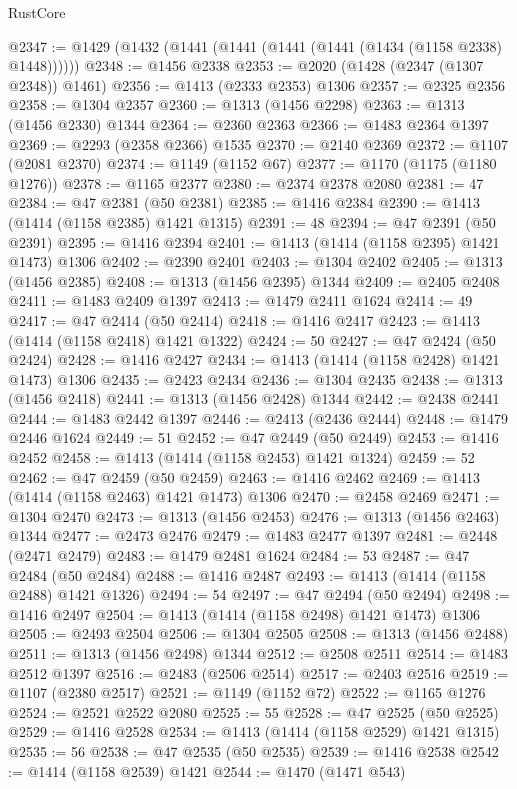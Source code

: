 \begin{lexlean}{RustCore}
\begin{coremodule}
@2347 := @1429 (@1432 (@1441 (@1441 (@1441 (@1441 (@1434 (@1158 @2338) @1448))))))
@2348 := @1456 @2338
@2353 := @2020 (@1428 (@2347 (@1307 @2348)) @1461)
@2356 := @1413 (@2333 @2353) @1306
@2357 := @2325 @2356
@2358 := @1304 @2357
@2360 := @1313 (@1456 @2298)
@2363 := @1313 (@1456 @2330) @1344
@2364 := @2360 @2363
@2366 := @1483 @2364 @1397
@2369 := @2293 (@2358 @2366) @1535
@2370 := @2140 @2369
@2372 := @1107 (@2081 @2370)
@2374 := @1149 (@1152 @67)
@2377 := @1170 (@1175 (@1180 @1276))
@2378 := @1165 @2377
@2380 := @2374 @2378 @2080
@2381 := 47
@2384 := @47 @2381 (@50 @2381)
@2385 := @1416 @2384
@2390 := @1413 (@1414 (@1158 @2385) @1421 @1315)
@2391 := 48
@2394 := @47 @2391 (@50 @2391)
@2395 := @1416 @2394
@2401 := @1413 (@1414 (@1158 @2395) @1421 @1473) @1306
@2402 := @2390 @2401
@2403 := @1304 @2402
@2405 := @1313 (@1456 @2385)
@2408 := @1313 (@1456 @2395) @1344
@2409 := @2405 @2408
@2411 := @1483 @2409 @1397
@2413 := @1479 @2411 @1624
@2414 := 49
@2417 := @47 @2414 (@50 @2414)
@2418 := @1416 @2417
@2423 := @1413 (@1414 (@1158 @2418) @1421 @1322)
@2424 := 50
@2427 := @47 @2424 (@50 @2424)
@2428 := @1416 @2427
@2434 := @1413 (@1414 (@1158 @2428) @1421 @1473) @1306
@2435 := @2423 @2434
@2436 := @1304 @2435
@2438 := @1313 (@1456 @2418)
@2441 := @1313 (@1456 @2428) @1344
@2442 := @2438 @2441
@2444 := @1483 @2442 @1397
@2446 := @2413 (@2436 @2444)
@2448 := @1479 @2446 @1624
@2449 := 51
@2452 := @47 @2449 (@50 @2449)
@2453 := @1416 @2452
@2458 := @1413 (@1414 (@1158 @2453) @1421 @1324)
@2459 := 52
@2462 := @47 @2459 (@50 @2459)
@2463 := @1416 @2462
@2469 := @1413 (@1414 (@1158 @2463) @1421 @1473) @1306
@2470 := @2458 @2469
@2471 := @1304 @2470
@2473 := @1313 (@1456 @2453)
@2476 := @1313 (@1456 @2463) @1344
@2477 := @2473 @2476
@2479 := @1483 @2477 @1397
@2481 := @2448 (@2471 @2479)
@2483 := @1479 @2481 @1624
@2484 := 53
@2487 := @47 @2484 (@50 @2484)
@2488 := @1416 @2487
@2493 := @1413 (@1414 (@1158 @2488) @1421 @1326)
@2494 := 54
@2497 := @47 @2494 (@50 @2494)
@2498 := @1416 @2497
@2504 := @1413 (@1414 (@1158 @2498) @1421 @1473) @1306
@2505 := @2493 @2504
@2506 := @1304 @2505
@2508 := @1313 (@1456 @2488)
@2511 := @1313 (@1456 @2498) @1344
@2512 := @2508 @2511
@2514 := @1483 @2512 @1397
@2516 := @2483 (@2506 @2514)
@2517 := @2403 @2516
@2519 := @1107 (@2380 @2517)
@2521 := @1149 (@1152 @72)
@2522 := @1165 @1276
@2524 := @2521 @2522 @2080
@2525 := 55
@2528 := @47 @2525 (@50 @2525)
@2529 := @1416 @2528
@2534 := @1413 (@1414 (@1158 @2529) @1421 @1315)
@2535 := 56
@2538 := @47 @2535 (@50 @2535)
@2539 := @1416 @2538
@2542 := @1414 (@1158 @2539) @1421
@2544 := @1470 (@1471 @543)

\end{coremodule}
\end{lexlean}
